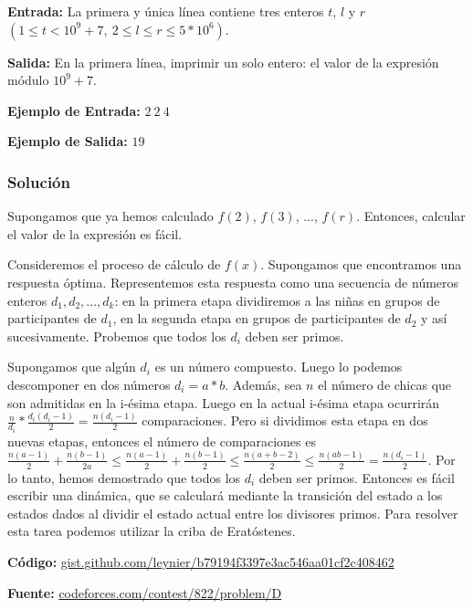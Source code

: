 \documentclass[12pt]{article}
\newcommand{\nl}{\vspace{0.3cm}}
\begin{document}
\textbf{Entrada:} La primera y única línea contiene tres enteros $t$, $l$ y $r$ $(1 \leqslant t < 10^9 + 7,\ 2 \leqslant l \leqslant r \leqslant 5 * 10^6)$.

\nl

\textbf{Salida:} En la primera línea, imprimir un solo entero: el valor de la expresión módulo $10^9 + 7$.

\nl

\textbf{Ejemplo de Entrada:} $2\ 2\ 4$

\nl

\textbf{Ejemplo de Salida:} $19$

\subsubsection{Solución}

Supongamos que ya hemos calculado $f(2)$, $f(3)$, $...$, $f(r)$. Entonces, calcular el valor de la expresión es fácil.

\nl

Consideremos el proceso de cálculo de $f(x)$. Supongamos que encontramos una respuesta óptima. Representemos esta respuesta como una secuencia de números enteros $d_1, d_2, ..., d_k$: en la primera etapa dividiremos a las niñas en grupos de participantes de $d_1$, en la segunda etapa en grupos de participantes de $d_2$ y así sucesivamente. Probemos que todos los $d_i$ deben ser primos.

\nl

Supongamos que algún $d_i$ es un número compuesto. Luego lo podemos descomponer en dos números $d_i = a * b$. Además, sea $n$ el número de chicas que son admitidas en la i-ésima etapa. Luego en la actual i-ésima etapa ocurrirán $ \frac{n}{d_i} * \frac{d_i(d_i - 1)}{2} =  \frac{n(d_i - 1)}{2}$ comparaciones. Pero si dividimos esta etapa en dos nuevas etapas, entonces el número de comparaciones es $ \frac{n(a-1)}{2} + \frac{n(b - 1)}{2a} \leqslant \frac{n(a-1)}{2} + \frac{n(b-1)}{2} \leqslant \frac{n(a+b-2)}{2} \leqslant \frac{n(ab - 1)}{2} = \frac{n(d_i - 1)}{2}$. Por lo tanto, hemos demostrado que todos los $d_i$ deben ser primos. Entonces es fácil escribir una dinámica, que se calculará mediante la transición del estado a los estados dados al dividir el estado actual entre los divisores primos. Para resolver esta tarea podemos utilizar la criba de Eratóstenes.

\nl

\textbf{Código:} \href{https://gist.github.com/leynier/b79194f3397e3ac546aa01cf2c408462}{gist.github.com/leynier/b79194f3397e3ac546aa01cf2c408462}

\nl

\textbf{Fuente:} \href{https://codeforces.com/contest/822/problem/D}{codeforces.com/contest/822/problem/D}

\newpage

\nocite{*}


	
\end{document}
